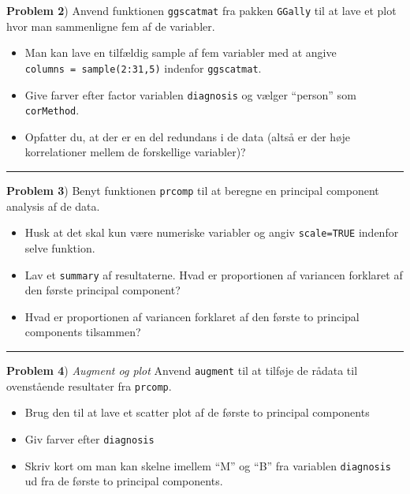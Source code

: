 \documentclass[
]{book}
\providecommand{\tightlist}{%
  \setlength{\itemsep}{0pt}\setlength{\parskip}{0pt}}
\begin{document}
\textbf{Problem 2}) Anvend funktionen \texttt{ggscatmat} fra pakken \texttt{GGally} til at lave et plot hvor man sammenligne fem af de variabler.

\begin{itemize}
\tightlist
\item
  Man kan lave en tilfældig sample af fem variabler med at angive \texttt{columns\ =\ sample(2:31,5)} indenfor \texttt{ggscatmat}.
\item
  Give farver efter factor variablen \texttt{diagnosis} og vælger ``person'' som \texttt{corMethod}.
\item
  Opfatter du, at der er en del redundans i de data (altså er der høje korrelationer mellem de forskellige variabler)?
\end{itemize}

\begin{center}\rule{0.5\linewidth}{0.5pt}\end{center}

\textbf{Problem 3}) Benyt funktionen \texttt{prcomp} til at beregne en principal component analysis af de data.

\begin{itemize}
\tightlist
\item
  Husk at det skal kun være numeriske variabler og angiv \texttt{scale=TRUE} indenfor selve funktion.
\item
  Lav et \texttt{summary} af resultaterne. Hvad er proportionen af variancen forklaret af den første principal component?
\item
  Hvad er proportionen af variancen forklaret af den første to principal components tilsammen?
\end{itemize}

\begin{center}\rule{0.5\linewidth}{0.5pt}\end{center}

\textbf{Problem 4}) \emph{Augment og plot} Anvend \texttt{augment} til at tilføje de rådata til ovenstående resultater fra \texttt{prcomp}.

\begin{itemize}
\tightlist
\item
  Brug den til at lave et scatter plot af de første to principal components
\item
  Giv farver efter \texttt{diagnosis}
\item
  Skriv kort om man kan skelne imellem ``M'' og ``B'' fra variablen \texttt{diagnosis} ud fra de første to principal components.
\end{itemize}
\end{document}

